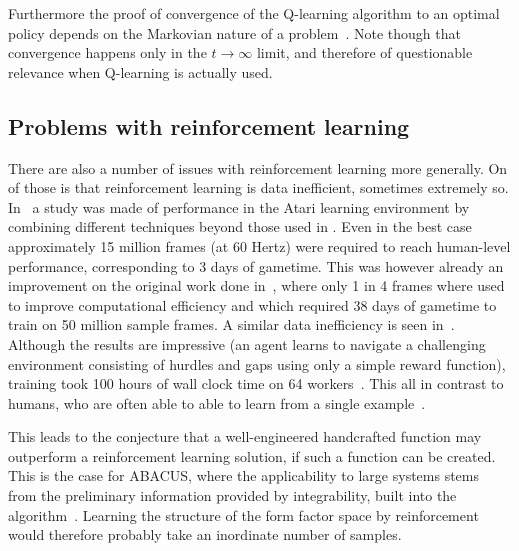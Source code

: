 \documentclass[11pt, a4paper]{report} %
\begin{document}
Furthermore the proof of convergence of the Q-learning algorithm to an optimal policy depends on the Markovian nature of a problem~\cite{watkins92_q_learn}.
Note though that convergence happens only in the \(t\to\infty\) limit, and therefore of questionable relevance when Q-learning is actually used.


\subsection{Problems with reinforcement learning}


There are also a number of issues with reinforcement learning more generally.
On of those is that reinforcement learning is data inefficient, sometimes extremely so.
In~\cite{1710.02298} a study was made of performance in the Atari learning environment by combining different techniques beyond those used in \cite{mnih13_playin_atari_with_deep_reinf_learn,mnih15_human_level_contr_throug_deep_reinf_learn}.
Even in the best case approximately 15 million frames (at 60 Hertz) were required to reach human-level performance, corresponding to 3 days of gametime.
This was however already an improvement on the original work done in~\cite{mnih15_human_level_contr_throug_deep_reinf_learn}, where only 1 in 4 frames where used to improve computational efficiency and which required 38 days of gametime to train on 50 million sample frames.
A similar data inefficiency is seen in~\cite{heess17_emerg_locom_behav_rich_envir}.
Although the results are impressive (an agent learns to navigate a challenging environment consisting of hurdles and gaps using only a simple reward function), training took 100 hours of wall clock time on 64 workers~\cite[Figure 1]{heess17_emerg_locom_behav_rich_envir}.
This all in contrast to humans, who are often able to able to learn from a single example~\cite{marcus18_deep_learn}.

This leads to the conjecture that a well-engineered handcrafted function may outperform a reinforcement learning solution, if such a function can be created.
This is the case for ABACUS, where the applicability to large systems stems from the preliminary information provided by integrability, built into the algorithm~\cite{Caux2009}.
Learning the structure of the form factor space by reinforcement would therefore probably take an inordinate number of samples.
\end{document}
